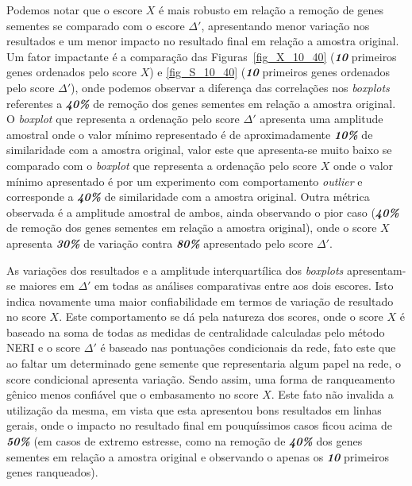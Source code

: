 Podemos notar que o escore $X$ é mais robusto em relação a remoção de genes sementes se comparado com o escore $\Delta'$, apresentando menor variação nos resultados e um menor impacto no resultado final em relação a amostra original. Um fator impactante é a comparação das Figuras~\ref{fig_X_10_40} (\textsl{\textbf{10}} primeiros genes ordenados pelo score $X$) e \ref{fig_S_10_40} (\textsl{\textbf{10}} primeiros genes ordenados pelo score $\Delta'$), onde podemos observar a diferença das correlações nos \textsl{boxplots} referentes a \textsl{\textbf{40\%}} de remoção dos genes sementes em relação a amostra original. O \textsl{boxplot} que representa a ordenação pelo score $\Delta'$ apresenta uma amplitude amostral onde o valor mínimo representado é de aproximadamente \textsl{\textbf{10\%}} de similaridade com a amostra original, valor este que apresenta-se muito baixo se comparado com o \textsl{boxplot} que representa a ordenação pelo score $X$ onde o valor mínimo apresentado é por um experimento com comportamento \textsl{outlier} e corresponde a \textsl{\textbf{40\%}} de similaridade com a amostra original. Outra métrica observada é a amplitude amostral de ambos, ainda observando o pior caso (\textsl{\textbf{40\%}} de remoção dos genes sementes em relação a amostra original), onde o score $X$ apresenta \textsl{\textbf{30\%}} de variação contra \textsl{\textbf{80\%}} apresentado pelo score $\Delta'$.
%

%
As variações dos resultados e a amplitude interquartílica dos \textsl{boxplots} apresentam-se maiores em $\Delta'$ em todas as análises comparativas entre aos dois escores. Isto indica novamente uma maior confiabilidade em termos de variação de resultado no score $X$. Este comportamento se dá pela natureza dos scores, onde o score $X$ é baseado na soma de todas as medidas de centralidade calculadas pelo método NERI e o score $\Delta'$ é baseado nas pontuações condicionais da rede, fato este que ao faltar um determinado gene semente que representaria algum papel na rede, o score condicional apresenta variação. Sendo assim, uma forma de ranqueamento gênico menos confiável que o embasamento no score $X$. Este fato não invalida a utilização da mesma, em vista que esta apresentou bons resultados em linhas gerais, onde o impacto no resultado final em pouquíssimos casos ficou acima de \textsl{\textbf{50\%}} (em casos de extremo estresse, como na remoção de \textsl{\textbf{40\%}} dos genes sementes em relação a amostra original e observando o apenas os \textsl{\textbf{10}} primeiros genes ranqueados).
%

